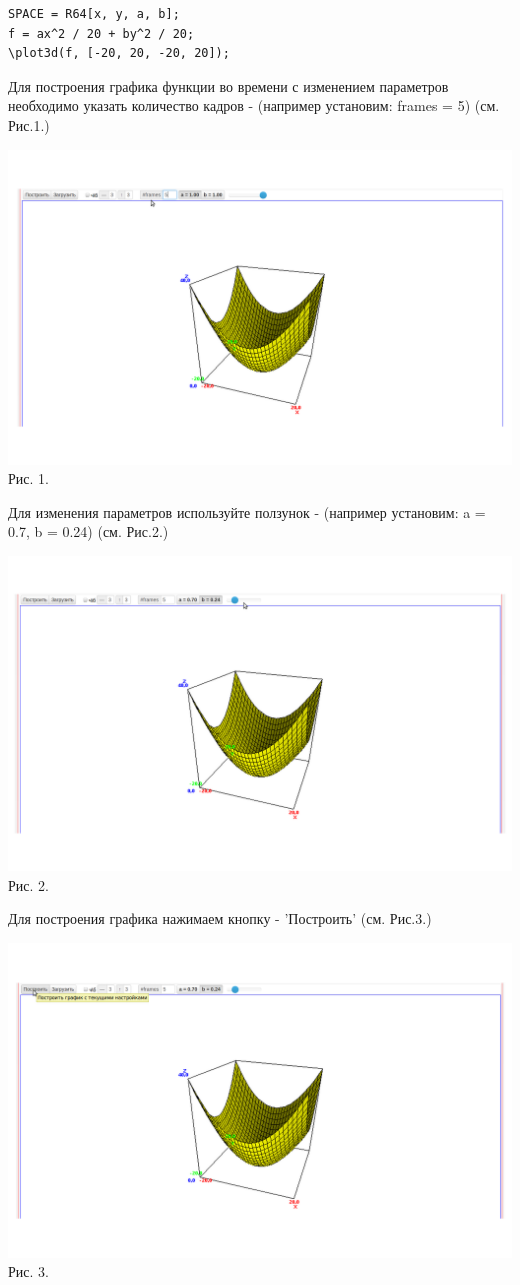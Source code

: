 \begin{verbatim}
SPACE = R64[x, y, a, b];
f = ax^2 / 20 + by^2 / 20;
\plot3d(f, [-20, 20, -20, 20]);
\end{verbatim}


Для построения графика функции во времени с изменением параметров необходимо указать количество кадров - (например установим: frames = 5) (см. Рис.1.)

\includegraphics[scale=0.35]{pictures/3_9}
Рис. 1.

Для изменения параметров используйте ползунок - (например установим: a = 0.7, b = 0.24) (см. Рис.2.)

\includegraphics[scale=0.35]{pictures/3_10}
Рис. 2.

Для построения графика нажимаем кнопку - 'Построить' (см. Рис.3.)

\includegraphics[scale=0.35]{pictures/3_11}
Рис. 3.

